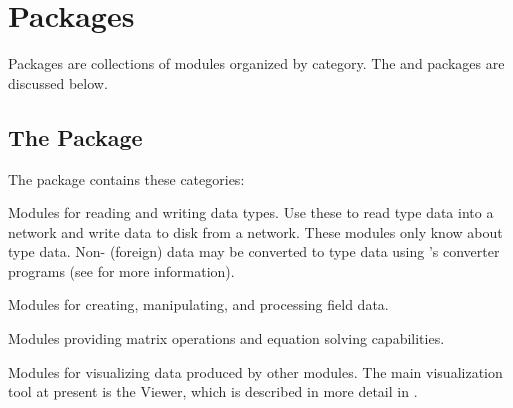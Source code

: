 %
%
%
%
%
%

\chapter{Packages}
\label{ch:packages}

Packages are collections of modules organized by category. The \SR{} and 
packages are discussed below. 

\section{The \sr{} Package}
\label{sec:srpackage}


The \sr{} package contains these categories:

\begin{description}
   Modules for reading and writing \sr{}
  data types.  Use these to read \sr{} type data into a network and
  write data to disk from a network.  These modules only know about
  \sr{} type data.  Non-\sr{} (foreign) data may be converted to \sr{}
  type data using \sr{}'s converter programs (see  for more information).
  
   Modules for creating, manipulating, and
  processing field data.
  
   Modules providing matrix operations and
  equation solving capabilities.
  
   Modules for visualizing data produced by
  other modules.  The main visualization tool at present
  is the Viewer, which is described in more detail in
  .
\end{description}

